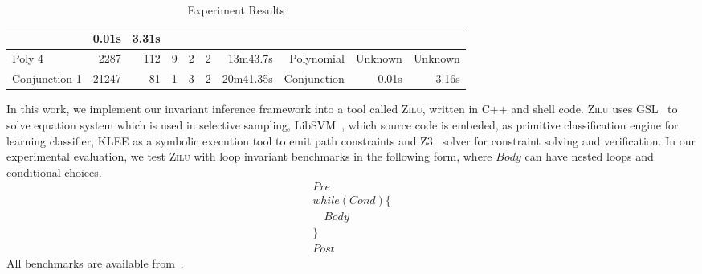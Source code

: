 \begin{table*}[t]
\begin{center}
\begin{center}
\begin{adjustbox}{max width=1\textwidth}
\begin{tabular}{l | r | r | r | r | r | r | r | r | r}
            & 0.01s & 3.31s 
            \\
        \hline
        Poly 4 
            & 2287 & 112 & 9
            & 2 & 2
            & 13m43.7s & Polynomial
            & Unknown & Unknown 
            \\
        \hline
        Conjunction 1
            & 21247 & 81 & 1 
            & 3 & 2 
            & 20m41.35s & Conjunction
            & 0.01s & 3.16s
            \\
        \hline
    \end{tabular}
    \end{adjustbox}
    \end{center}
    \end{center}
    \caption{Experiment Results}
    \label{tab:experiments}
\end{table*}

In this work, we implement our invariant inference framework into a tool called \textsc{Zilu}, 
written in C++ and shell code. 
\textsc{Zilu} uses GSL~\cite{gough2009gnu} to solve equation system which is used in selective sampling, 
LibSVM~\cite{chang2011libsvm}, which source code is embeded, as primitive classification engine for learning classifier, 
KLEE\cite{cadar2008klee} as a symbolic execution tool to emit path constraints 
and Z3~\cite{de2008z3} solver for constraint solving and verification. 
In our experimental evaluation, 
we test \textsc{Zilu} with  loop invariant benchmarks 
in the following form, where $\mathit{Body}$ can have nested loops and conditional choices. 
\begin{align*}
&Pre&\\
&while (Cond) \{&\\
&  \quad Body &\\
&\} &\\
&Post &
\end{align*}
All benchmarks are available from~\cite{zilu}. 

